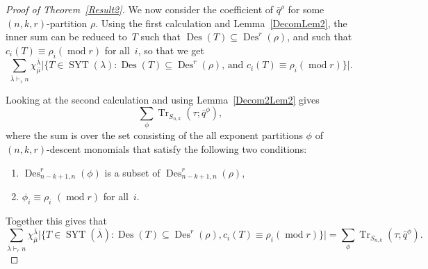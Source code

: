 \documentclass[ALCO,ThmDefs,Unicode,epreuves]{cedram}
\DeclareMathOperator{\modrm}{mod}
\DeclareMathOperator{\Des}{Des}
\DeclareMathOperator{\SYT}{SYT}
\DeclareMathOperator{\Tr}{Tr}
\begin{document}
\begin{proof}[Proof of Theorem~\ref{Result2}]
		We now consider the coefficient of $\bar{q}^\rho$ for some $(n,k,r)$-partition $\rho$. Using the first calculation and 
Lemma~\ref{DecomLem2}, the inner sum can be reduced to~$T$ such that $\Des (T)\subseteq \Des ^r(\rho)$, and such that 
$c_i(T)\equiv \rho_i (\modrm r)$ for all~$i$, so that we get
\begin{equation}
\sum_{\overline{\lambda}\vdash_r n} 
\chi^{\overline{\lambda}}_{\overline{\mu}}\vert \{T\in \SYT (\lambda): \Des (T)\subseteq \Des ^r(\rho)\text{, and } 
c_i(T)\equiv \rho_i (\modrm r)\}\vert.
\end{equation}

Looking at the second calculation and using Lemma~\ref{Decom2Lem2} gives
\begin{equation}
\sum_{\phi} 
\Tr _{S_{n,k}}(\tau;\bar{q}^{\phi}),
\end{equation}
where the sum is over the set consisting of the all exponent partitions $\phi$ 
of $(n,k,r)$-descent monomials that satisfy the following two conditions:

	\begin{enumerate}

	\item $\Des ^r_{n-k+1,n}(\phi)$ is a subset of $\Des ^r_{n-k+1,n}(\rho)$,
	
	\item $\phi_i\equiv \rho_i$ $(\modrm r)$ for all~$i$.
	
	
	\end{enumerate}

Together this gives that
\begin{equation}
\sum_{\overline{\lambda}\vdash_r n} \chi^{\overline{\lambda}}_{\overline{\mu}}\vert 
\{T\in \SYT (\overline{\lambda}): \Des (T)\subseteq \Des ^r(\rho), c_i(T)\equiv \rho_i (\modrm r)\}\vert=\sum_{\phi} 
\Tr _{S_{n,k}}(\tau;\bar{q}^{\phi}).
\end{equation}


\end{proof}
\end{document}
